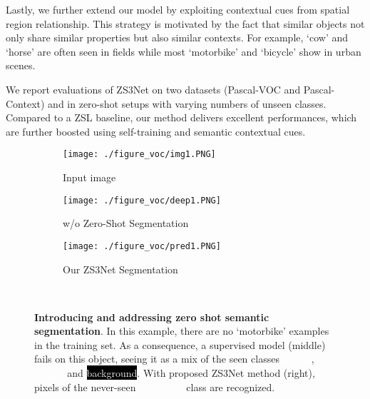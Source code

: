 \documentclass{article}
\begin{document}
Lastly, we further extend our model by exploiting contextual cues from spatial region relationship. This strategy is motivated by the fact that similar objects not only share similar properties but also similar contexts. For example, `cow' and `horse' are often seen in fields while most `motorbike' and `bicycle' show in urban scenes.

We report evaluations of ZS3Net on two datasets (Pascal-VOC and Pascal-Context) and in zero-shot setups with varying numbers of unseen classes. Compared to a ZSL baseline, our method delivers excellent performances, which are further boosted using self-training and semantic contextual cues. 

\begin{figure*}[t!]
\captionsetup[subfigure]{labelformat=empty}
	\begin{center}
		\begin{subfigure}[t]{0.32\textwidth}\centering
			\caption{Input image}\vspace{-0.2cm}
			\texttt{[image: ./figure\_voc/img1.PNG]}
		\end{subfigure}
		\begin{subfigure}[t]{0.32\textwidth}\centering
			\caption{w/o Zero-Shot Segmentation}\vspace{-0.2cm}
			\texttt{[image: ./figure\_voc/deep1.PNG]}
		\end{subfigure}
		\begin{subfigure}[t]{0.32\textwidth}\centering
			\caption{Our ZS3Net Segmentation}\vspace{-0.2cm}
			\texttt{[image: ./figure\_voc/pred1.PNG]}
		\end{subfigure}\\\vspace{0.1cm}
	\end{center}
	\vspace{-0.3cm}
	\caption{\small \textbf{Introducing and addressing zero shot semantic segmentation}. 
	In this example, there are no `motorbike' examples in the training set. As a consequence, a supervised model (middle) fails on this object, 
	seeing it as a mix of the seen classes 
	\setlength{\fboxsep}{1pt}\colorbox{col_person}{\textcolor{white}{person}}, 
	\setlength{\fboxsep}{1pt}\colorbox{col_cycle}{\textcolor{white}{bicycle}} and 
	\setlength{\fboxsep}{1pt}\colorbox{black}{\textcolor{white}{background}}. 
	With proposed ZS3Net method (right), pixels of the never-seen 
	\setlength{\fboxsep}{1pt}\colorbox{col_bike}{\textcolor{white}{motorbike}}
	class are recognized.}
	\vspace{-0.5cm}
	\label{fig:bp}
\end{figure*}
\end{document}
